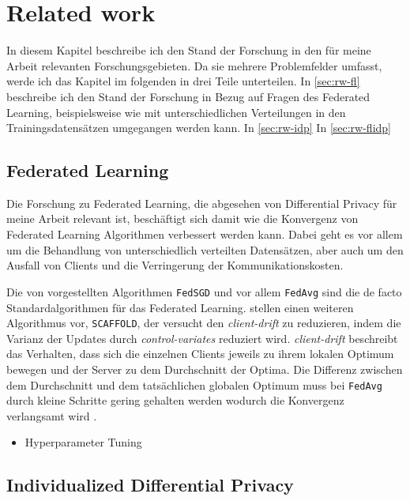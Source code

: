 \chapter{Related work}

In diesem Kapitel beschreibe ich den Stand der Forschung in den für meine Arbeit relevanten Forschungsgebieten. Da sie mehrere Problemfelder umfasst, werde ich das Kapitel im folgenden in drei Teile unterteilen. In \autoref{sec:rw-fl} beschreibe ich den Stand der Forschung in Bezug auf Fragen des Federated Learning, beispielsweise wie mit unterschiedlichen Verteilungen in den Trainingsdatensätzen umgegangen werden kann. In \autoref{sec:rw-idp}
In \autoref{sec:rw-flidp}

\section{Federated Learning}\label{sec:rw-fl}

Die Forschung zu Federated Learning, die abgesehen von Differential Privacy für meine Arbeit relevant ist, beschäftigt sich damit wie die Konvergenz von Federated Learning Algorithmen verbessert werden kann. Dabei geht es vor allem um die Behandlung von unterschiedlich verteilten Datensätzen, aber auch um den Ausfall von Clients und die Verringerung der Kommunikationskosten.

Die von \textcite{mcmahan:2016} vorgestellten Algorithmen \texttt{FedSGD} und vor allem \texttt{FedAvg} sind die de facto Standardalgorithmen für das Federated Learning. \textcite{karimireddy:2020} stellen einen weiteren Algorithmus vor, \texttt{SCAFFOLD}, der versucht den \textit{client-drift} zu reduzieren, indem die Varianz der Updates durch \textit{control-variates} reduziert wird. \textit{client-drift} beschreibt das Verhalten, dass sich die einzelnen Clients jeweils zu ihrem lokalen Optimum bewegen und der Server zu dem Durchschnitt der Optima. Die Differenz zwischen dem Durchschnitt und dem tatsächlichen globalen Optimum muss bei \texttt{FedAvg} durch kleine Schritte gering gehalten werden wodurch die Konvergenz verlangsamt wird \parencite[p.4]{karimireddy:2020}.

\begin{itemize}
	\item Hyperparameter Tuning
\end{itemize}


\section{Individualized Differential Privacy}\label{sec:rw-idp}

